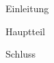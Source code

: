 \documentclass[12pt,german]{g-brief}
\begin{document}
\begin{g-brief}
Einleitung
 
Hauptteil

Schluss
\end{g-brief}
\end{document}
